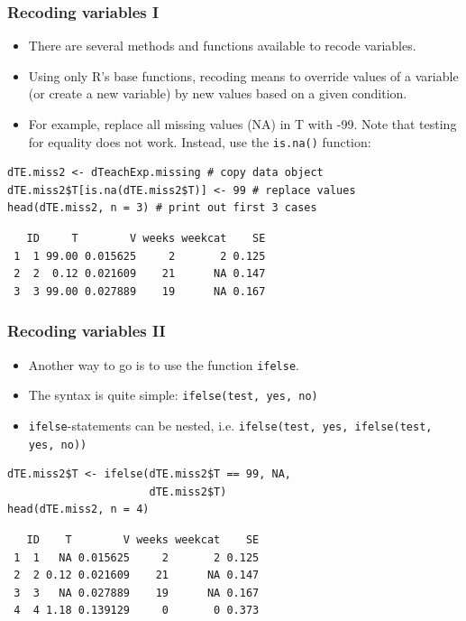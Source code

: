 \documentclass[bigger]{beamer}
\begin{document}
\begin{frame}[fragile,shrink = 5]
\frametitle{Recoding variables I}
\label{sec-4-1-9}

\begin{itemize}
\item There are several methods and functions available to recode variables.
\item Using only R's base functions, recoding means to override values of a
      variable (or create a new variable) by new values based on a given condition.
\item For example, replace all missing values (NA) in T with -99. Note that
      testing for equality does not work. Instead, use the \texttt{is.na()} 
      function:
\end{itemize}


\lstset{language=R}
\begin{lstlisting}
dTE.miss2 <- dTeachExp.missing # copy data object
dTE.miss2$T[is.na(dTE.miss2$T)] <- 99 # replace values
head(dTE.miss2, n = 3) # print out first 3 cases
\end{lstlisting}

\begin{verbatim}
   ID     T        V weeks weekcat    SE
 1  1 99.00 0.015625     2       2 0.125
 2  2  0.12 0.021609    21      NA 0.147
 3  3 99.00 0.027889    19      NA 0.167
\end{verbatim}

\end{frame}
\begin{frame}[fragile,shrink = 5]
\frametitle{Recoding variables II}
\label{sec-4-1-10}

\begin{itemize}
\item Another way to go is to use the function \texttt{ifelse}.
\item The syntax is quite simple: \texttt{ifelse(test, yes, no)}
\item \texttt{ifelse}-statements can be nested, i.e. \texttt{ifelse(test, yes, ifelse(test,       yes, no))}
\end{itemize}


\lstset{language=R}
\begin{lstlisting}
dTE.miss2$T <- ifelse(dTE.miss2$T == 99, NA, 
                      dTE.miss2$T)
head(dTE.miss2, n = 4)
\end{lstlisting}

\begin{verbatim}
   ID    T        V weeks weekcat    SE
 1  1   NA 0.015625     2       2 0.125
 2  2 0.12 0.021609    21      NA 0.147
 3  3   NA 0.027889    19      NA 0.167
 4  4 1.18 0.139129     0       0 0.373
\end{verbatim}
\end{frame}
\end{document}
